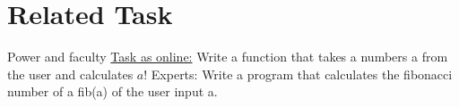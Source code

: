 \section{Related Task}
\begin{frame}{Power and faculty}
    \href{http://fsr.github.io/c-lessons/exercises/11_practising_recursion.htmll}{Task as online:} \newline
    Write a function that takes a numbers a from the user and calculates \begin{math}{a!}\end{math}
    \newline 
    \newline
    Experts: Write a program that calculates the fibonacci number of a fib(a) of the user input a.
\end{frame}



